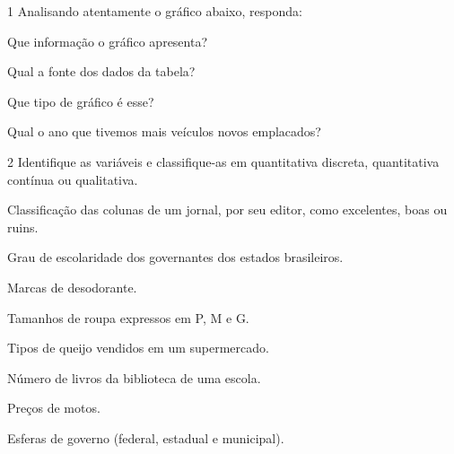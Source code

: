 
\num{1} Analisando atentamente o gráfico abaixo, responda:


\begin{escolha}
\item
  Que informação o gráfico apresenta?


\item
  Qual a fonte dos dados da tabela?


\item
  Que tipo de gráfico é esse?


\item
  Qual o ano que tivemos mais veículos novos emplacados?

\end{escolha}


\num{2} Identifique as variáveis e classifique-as em quantitativa discreta,
quantitativa contínua ou qualitativa.

\begin{escolha}
\item
  Classificação das colunas de um jornal, por seu editor, como
  excelentes, boas ou ruins.


\item
  Grau de escolaridade dos governantes dos estados brasileiros.


\item
  Marcas de desodorante.


\item
  Tamanhos de roupa expressos em P, M e G.


\item
  Tipos de queijo vendidos em um supermercado.


\item
  Número de livros da biblioteca de uma escola.


\item
  Preços de motos.


\item
  Esferas de governo (federal, estadual e municipal).

\end{escolha}

